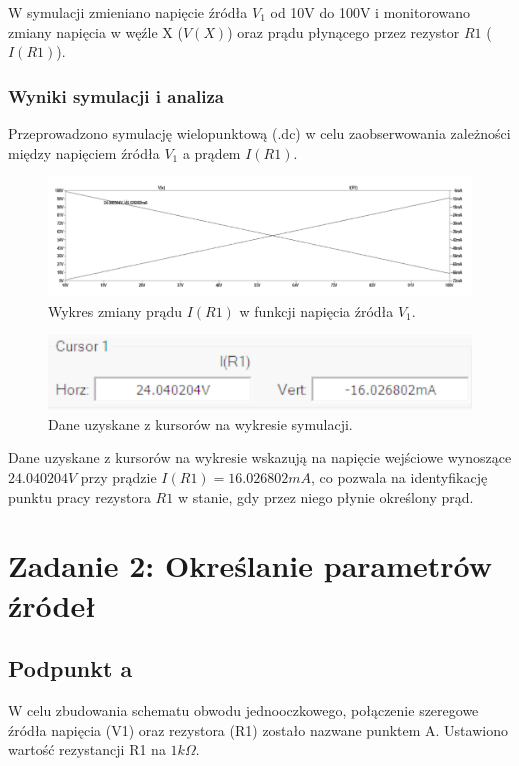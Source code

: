 \documentclass[10pt]{article}
\begin{document}
	W symulacji zmieniano napięcie źródła \( V_1 \) od 10V do 100V i monitorowano zmiany napięcia w węźle X (\( V(X) \)) oraz prądu płynącego przez rezystor \( R1 \) (\( I(R1) \)).
	
	\subsubsection*{Wyniki symulacji i analiza}
	Przeprowadzono symulację wielopunktową (.dc) w celu zaobserwowania zależności między napięciem źródła \( V_1 \) a prądem \( I(R1) \).
	
	\begin{figure}[H]
		\centering
		\includegraphics[width=\linewidth]{1bwykres}
		\caption{Wykres zmiany prądu \( I(R1) \) w funkcji napięcia źródła \( V_1 \).}
		\label{fig:1bwykres}
	\end{figure}
	
	\begin{figure}[H]
		\centering
		\includegraphics[width=\linewidth]{1bwyniki}
		\caption{Dane uzyskane z kursorów na wykresie symulacji.}
		\label{fig:cursor_data}
	\end{figure}
	
	Dane uzyskane z kursorów na wykresie wskazują na napięcie wejściowe wynoszące \(24.040204V\) przy prądzie \(I(R1) = 16.026802mA\), co pozwala na identyfikację punktu pracy rezystora \(R1\) w stanie, gdy przez niego płynie określony prąd.
	

	\section*{Zadanie 2: Określanie parametrów źródeł}
	
	\subsection*{Podpunkt a}
	W celu zbudowania schematu obwodu jednooczkowego, połączenie szeregowe źródła napięcia (V1) oraz rezystora (R1) zostało nazwane punktem A. Ustawiono wartość rezystancji R1 na \(1k\Omega\). 
	
\end{document}
